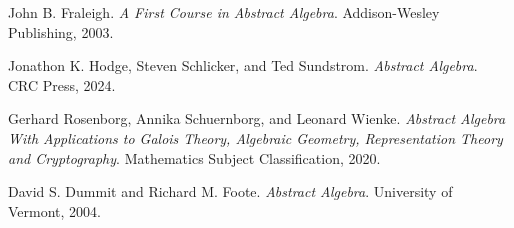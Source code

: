 \documentclass{arabicClass}
\begin{document}
	\abovedisplayskip=7pt
	\belowdisplayskip=7pt
	
	
	
	
	
	
	\tableofcontents
	\clearpage
	
	
	
	
	
	
	
	\begin{thebibliography}{9}
		\begin{english}
		John B. Fraleigh.  
		\textit{A First Course in Abstract Algebra}.  
		Addison-Wesley Publishing, 2003.
		
		Jonathon K. Hodge, Steven Schlicker, and Ted Sundstrom.  
		\textit{Abstract Algebra}.  
		CRC Press, 2024.
		
		Gerhard Rosenborg, Annika Schuernborg, and Leonard Wienke.  
		\textit{Abstract Algebra With Applications to Galois Theory, Algebraic Geometry, Representation Theory and Cryptography}.  
		Mathematics Subject Classification, 2020.
		
		David S. Dummit and Richard M. Foote.  
		\textit{Abstract Algebra}.  
		University of Vermont, 2004.
		\end{english}
		
	\end{thebibliography}
	
\end{document}
